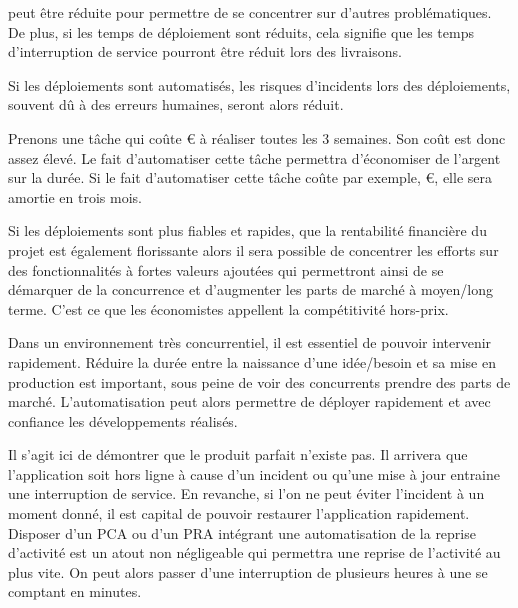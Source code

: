 \begin{description}
	\setlength\itemsep{0em}
	\item [La durée de de déploiement] peut être réduite pour permettre de se concentrer sur d'autres problématiques. De plus, si les temps de déploiement sont réduits, cela signifie que les temps d'interruption de service pourront être réduit lors des livraisons.
	\item [Erreur de déploiement] Si les déploiements sont automatisés, les risques d'incidents lors des déploiements, souvent dû à des erreurs humaines, seront alors réduit.
	\item [Rentabilité financière] Prenons une tâche qui coûte € à réaliser toutes les 3 semaines. Son coût est donc assez élevé. Le fait d'automatiser cette tâche permettra d'économiser de l'argent sur la durée. Si le fait d'automatiser cette tâche coûte par exemple, €, elle sera amortie en trois mois.\label{ref-rentabilite-finance}
	\item [Part de marché] Si les déploiements sont plus fiables et rapides, que la rentabilité financière du projet est également florissante alors il sera possible de concentrer les efforts sur des fonctionnalités à fortes valeurs ajoutées qui permettront ainsi de se démarquer de la concurrence et d'augmenter les parts de marché à moyen/long terme. C'est ce que les économistes appellent la compétitivité hors-prix.
	\item [\Gls{timetomarket}] Dans un environnement très concurrentiel, il est essentiel de pouvoir intervenir rapidement. Réduire la durée entre la naissance d'une idée/besoin et sa mise en production est important, sous peine de voir des concurrents prendre des parts de marché. L'automatisation peut alors permettre de déployer rapidement et avec confiance les développements réalisés.
	\item [Reprise d'activité] Il s'agit ici de démontrer que le produit parfait n'existe pas. Il arrivera que l'application soit hors ligne à cause d'un incident ou qu'une mise à jour entraine une interruption de service. En revanche, si l'on ne peut éviter l'incident à un moment donné, il est capital de pouvoir restaurer l'application rapidement. Disposer d'un \gls{PCA} ou d'un \gls{PRA} intégrant une automatisation de la reprise d'activité est un atout non négligeable qui permettra une reprise de l'activité au plus vite. On peut alors passer d'une interruption de plusieurs heures à une se comptant en minutes.\label{ref-pra}
\end{description}

